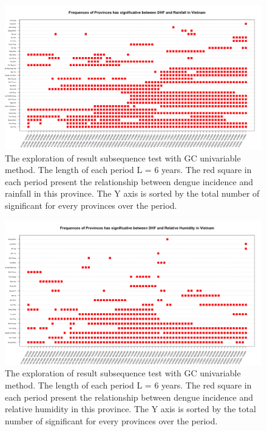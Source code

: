 \begin{figure}[h]
\begin{center}
\includegraphics[width = \linewidth]{../figures/annexe/result_rf.png}
\caption{The exploration of result subsequence test with GC univariable method. The length of each period L = 6 years. The red square in each period present the relationship between dengue incidence and rainfall in this province. The Y axis is sorted by the total number of significant for every provinces over the period. }
\label{expl_4}	
\end{center}
\end{figure}

\begin{figure}[h]
\begin{center}
\includegraphics[width = \linewidth]{../figures/annexe/result_rh.png}
\caption{The exploration of result subsequence test with GC univariable method. The length of each period L = 6 years. The red square in each period present the relationship between dengue incidence and relative humidity in this province. The Y axis is sorted by the total number of significant for every provinces over the period. }
\label{expl_5}	
\end{center}
\end{figure}

